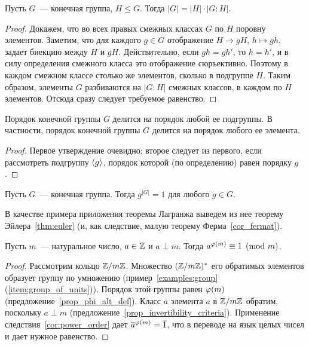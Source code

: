 \begin{theorem}
Пусть $G$~--- конечная группа, $H\leq G$. Тогда
$|G| = |H|\cdot |G:H|$.
\end{theorem}
\begin{proof}
Докажем, что во всех правых смежных классах $G$ по $H$ поровну
элементов. Заметим, что для каждого $g\in G$ отображение $H\to gH$,
$h\mapsto gh$, задает биекцию между $H$ и $gH$. Действительно, если
$gh=gh'$, то $h=h'$, и в силу определения смежного класса это
отображение сюръективно. Поэтому в каждом смежном классе столько же
элементов, сколько в подгруппе $H$. Таким образом, элементы $G$
разбиваются на $|G:H|$ смежных классов, в каждом по $H$
элементов. Отсюда сразу следует требуемое равенство.
\end{proof}
\begin{corollary}\label{cor:order_divides}
Порядок конечной группы $G$ делится на порядок любой ее подгруппы. В
частности, порядок конечной группы $G$ делится на порядок любого ее
элемента.
\end{corollary}
\begin{proof}
Первое утверждение очевидно; второе следует из первого, если
рассмотреть подгруппу $\langle g\rangle$, порядок которой (по определению)
равен порядку $g$.
\end{proof}

\begin{corollary}\label{cor:power_order}
Пусть $G$~--- конечная группа. Тогда $g^{|G|} = 1$ для любого $g\in G$.
\end{corollary}

В качестве примера приложения теоремы Лагранжа выведем из нее теорему
Эйлера~\ref{thm:euler} (и, как следствие, малую теорему
Ферма~\ref{cor_fermat}).

\begin{theorem}
Пусть $m$~--- натуральное число, $a\in\mathbb Z$ и $a\perp m$. Тогда
$a^{\varphi(m)}\equiv 1\pmod m$.
\end{theorem}
\begin{proof}
Рассмотрим кольцо $\mathbb Z/m\mathbb Z$. Множество $(\mathbb Z/m\mathbb Z)^*$ его
обратимых элементов образует группу по умножению
(пример~\ref{examples:group} (\ref{item:group_of_units})). Порядок этой
группы равен $\varphi(m)$ (предложение~\ref{prop_phi_alt_def}).
Класс $\overline{a}$ элемента $a$ в $\mathbb Z/m\mathbb Z$ обратим, поскольку
$a\perp m$ (предложение~\ref{prop_invertibility_criteria}).
Применение следствия~\ref{cor:power_order} дает
$\overline{a}^{\varphi(m)}=\overline{1}$, что в переводе на язык целых
чисел и дает нужное равенство.
\end{proof}

